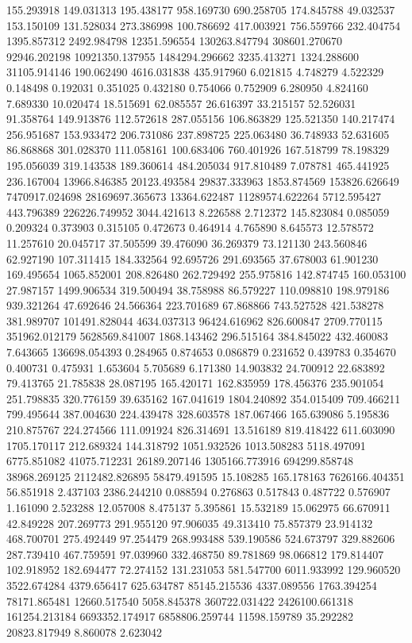 155.293918
149.031313
195.438177
958.169730
690.258705
174.845788
49.032537
153.150109
131.528034
273.386998
100.786692
417.003921
756.559766
232.404754
1395.857312
2492.984798
12351.596554
130263.847794
308601.270670
92946.202198
10921350.137955
1484294.296662
3235.413271
1324.288600
31105.914146
190.062490
4616.031838
435.917960
6.021815
4.748279
4.522329
0.148498
0.192031
0.351025
0.432180
0.754066
0.752909
6.280950
4.824160
7.689330
10.020474
18.515691
62.085557
26.616397
33.215157
52.526031
91.358764
149.913876
112.572618
287.055156
106.863829
125.521350
140.217474
256.951687
153.933472
206.731086
237.898725
225.063480
36.748933
52.631605
86.868868
301.028370
111.058161
100.683406
760.401926
167.518799
78.198329
195.056039
319.143538
189.360614
484.205034
917.810489
7.078781
465.441925
236.167004
13966.846385
20123.493584
29837.333963
1853.874569
153826.626649
7470917.024698
28169697.365673
13364.622487
11289574.622264
5712.595427
443.796389
226226.749952
3044.421613
8.226588
2.712372
145.823084
0.085059
0.209324
0.373903
0.315105
0.472673
0.464914
4.765890
8.645573
12.578572
11.257610
20.045717
37.505599
39.476090
36.269379
73.121130
243.560846
62.927190
107.311415
184.332564
92.695726
291.693565
37.678003
61.901230
169.495654
1065.852001
208.826480
262.729492
255.975816
142.874745
160.053100
27.987157
1499.906534
319.500494
38.758988
86.579227
110.098810
198.979186
939.321264
47.692646
24.566364
223.701689
67.868866
743.527528
421.538278
381.989707
101491.828044
4634.037313
96424.616962
826.600847
2709.770115
351962.012179
5628569.841007
1868.143462
296.515164
384.845022
432.460083
7.643665
136698.054393
0.284965
0.874653
0.086879
0.231652
0.439783
0.354670
0.400731
0.475931
1.653604
5.705689
6.171380
14.903832
24.700912
22.683892
79.413765
21.785838
28.087195
165.420171
162.835959
178.456376
235.901054
251.798835
320.776159
39.635162
167.041619
1804.240892
354.015409
709.466211
799.495644
387.004630
224.439478
328.603578
187.067466
165.639086
5.195836
210.875767
224.274566
111.091924
826.314691
13.516189
819.418422
611.603090
1705.170117
212.689324
144.318792
1051.932526
1013.508283
5118.497091
6775.851082
41075.712231
26189.207146
1305166.773916
694299.858748
38968.269125
2112482.826895
58479.491595
15.108285
165.178163
7626166.404351
56.851918
2.437103
2386.244210
0.088594
0.276863
0.517843
0.487722
0.576907
1.161090
2.523288
12.057008
8.475137
5.395861
15.532189
15.062975
66.670911
42.849228
207.269773
291.955120
97.906035
49.313410
75.857379
23.914132
468.700701
275.492449
97.254479
268.993488
539.190586
524.673797
329.882606
287.739410
467.759591
97.039960
332.468750
89.781869
98.066812
179.814407
102.918952
182.694477
72.274152
131.231053
581.547700
6011.933992
129.960520
3522.674284
4379.656417
625.634787
85145.215536
4337.089556
1763.394254
78171.865481
12660.517540
5058.845378
360722.031422
2426100.661318
161254.213184
6693352.174917
6858806.259744
11598.159789
35.292282
20823.817949
8.860078
2.623042
